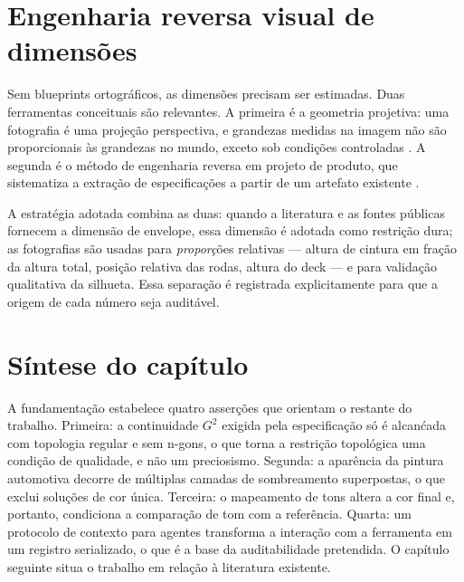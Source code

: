\section{Engenharia reversa visual de dimens\~oes}

Sem blueprints ortogr\'aficos, as dimens\~oes precisam ser estimadas. Duas ferramentas
conceituais s\~ao relevantes. A primeira \'e a geometria projetiva: uma fotografia \'e uma
proje\c{c}\~ao perspectiva, e grandezas medidas na imagem n\~ao s\~ao proporcionais \`as
grandezas no mundo, exceto sob condi\c{c}\~oes controladas \cite{hartley2004}. A segunda \'e o
m\'etodo de engenharia reversa em projeto de produto, que sistematiza a extra\c{c}\~ao de
especifica\c{c}\~oes a partir de um artefato existente \cite{otto2001}.

A estrat\'egia adotada combina as duas: quando a literatura e as fontes p\'ublicas fornecem a
dimens\~ao de envelope, essa dimens\~ao \'e adotada como restri\c{c}\~ao dura; as fotografias
s\~ao usadas para \emph{propor\c{c}}\~oes relativas --- altura de cintura em fra\c{c}\~ao da
altura total, posi\c{c}\~ao relativa das rodas, altura do deck --- e para valida\c{c}\~ao
qualitativa da silhueta. Essa separa\c{c}\~ao \'e registrada explicitamente para que a origem de
cada n\'umero seja audit\'avel.

\section{S\'intese do cap\'itulo}

A fundamenta\c{c}\~ao estabelece quatro asser\c{c}\~oes que orientam o restante do trabalho.
Primeira: a continuidade $G^2$ exigida pela especifica\c{c}\~ao s\'o \'e alcan\'cada com topologia
regular e sem n-gons, o que torna a restri\c{c}\~ao topol\'ogica uma condi\c{c}\~ao de
qualidade, e n\~ao um preciosismo. Segunda: a apar\^encia da pintura automotiva decorre de
m\'ultiplas camadas de sombreamento superpostas, o que exclui solu\c{c}\~oes de cor \'unica.
Terceira: o mapeamento de tons altera a cor final e, portanto, condiciona a compara\c{c}\~ao de
tom com a refer\^encia. Quarta: um protocolo de contexto para agentes transforma a intera\c{c}\~ao
com a ferramenta em um registro serializado, o que \'e a base da auditabilidade pretendida. O
cap\'itulo seguinte situa o trabalho em rela\c{c}\~ao \`a literatura existente.
